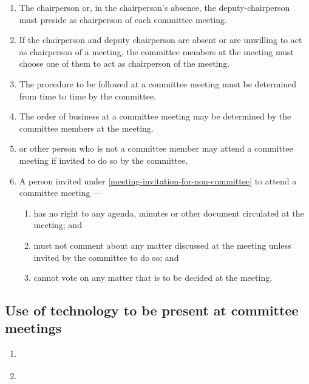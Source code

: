 \documentclass[../constitution.tex]{subfiles}
\begin{document}
\begin{enumerate}

\item The chairperson or, in the chairperson's absence, the deputy-chairperson must preside as chairperson of each committee meeting.
\item If the chairperson and deputy chairperson are absent or are unwilling to act as chairperson of a meeting, the committee members at the meeting must choose one of them to act as chairperson of the meeting.
\item The procedure to be followed at a committee meeting must be determined from time to time by the committee.
\item The order of business at a committee meeting may be determined by the committee members at the meeting.
\item {} or other person who is not a committee member may attend a committee meeting if invited to do so by the committee. \label{meeting-invitation-for-non-committee}
\item A person invited under  \ref{meeting-invitation-for-non-committee} to attend a committee meeting ---

  \begin{enumerate}
  
  \item has no right to any agenda, minutes or other document circulated at the meeting; and
  \item must not comment about any matter discussed at the meeting unless invited by the committee to do so; and
  \item cannot vote on any matter that is to be decided at the meeting.
  \end{enumerate}
\end{enumerate}

\hypertarget{use-of-technology-to-be-present-at-committee-meetings}{%
\subsection{Use of technology to be present at committee meetings}\label{use-of-technology-to-be-present-at-committee-meetings}}

\begin{enumerate}

\item {}\label{electronic-participation-committee-meeting-acceptable-to-secretary-and-chair} 
\item {}
\end{enumerate}
\end{document}
